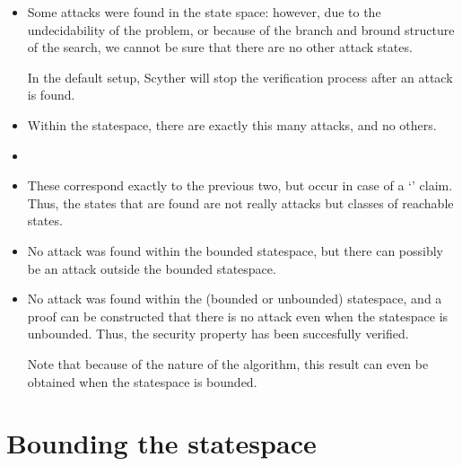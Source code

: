 \documentclass{book}
\begin{document}
\begin{itemize}

	\item {}

		Some attacks were found in the state space: however, due
		to the undecidability of the problem, or because of the
		branch and bround structure of the search, we cannot be
		sure that there are no other attack states.

		In the default setup, Scyther will stop the
		verification process after an attack is found.

	\item {}

		Within the statespace, there are exactly this many
		attacks, and no others.

	\item {}
	\item {}

		These correspond exactly to the previous two, but occur
		in case of a `' claim. Thus, the states
		that are found are not really attacks but classes of reachable
		states.

	\item {}

		No attack was found within the bounded statespace, but there can
		possibly be an attack outside the bounded statespace.

	\item {}

		No attack was found within the (bounded or unbounded) statespace, and a proof
		can be constructed that there is no attack even when the
		statespace is unbounded. Thus, the security property has
		been succesfully verified.

		Note that because of the nature of the algorithm, this
		result can even be obtained when the statespace is
		bounded.

\end{itemize}

\section{Bounding the statespace}
\end{document}
